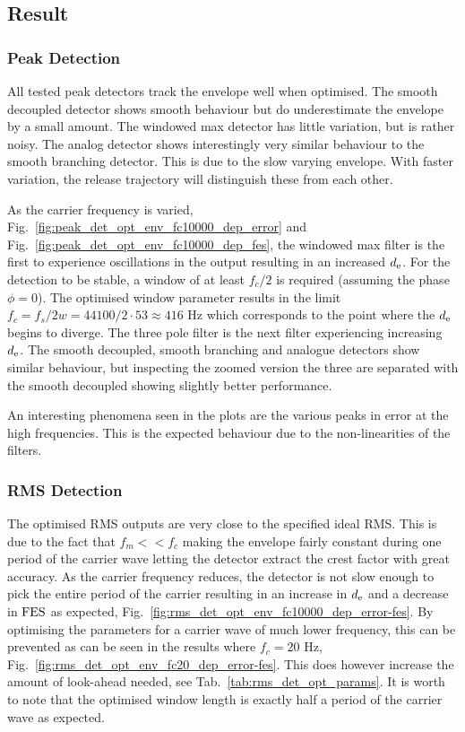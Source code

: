 \documentclass[../main2.tex]{subfiles}
\begin{document}
\subsection{Result}\label{discussion_results}
\subsubsection{Peak Detection}
All tested peak detectors track the envelope well when optimised. The smooth decoupled detector shows smooth behaviour but do underestimate the envelope by a small amount. The windowed max detector has little variation, but is rather noisy. The analog detector shows interestingly very similar behaviour to the smooth branching detector. This is due to the slow varying envelope. With faster variation, the release trajectory will distinguish these from each other.

As the carrier frequency is varied, Fig.~\ref{fig:peak_det_opt_env_fc10000_dep_error} and Fig.~\ref{fig:peak_det_opt_env_fc10000_dep_fes}, the windowed max filter is the first to experience oscillations in the output resulting in an increased $d_\text{e}$. For the detection to be stable, a window of at least $f_c/2$ is required (assuming the phase $\phi=0$). The optimised window parameter results in the limit $f_c =  f_s/2w = 44100/2\cdot 53 \approx 416$ Hz which corresponds to the point where the $d_\text{e}$ begins to diverge. The three pole filter is the next filter experiencing increasing $d_\text{e}$. The smooth decoupled, smooth branching and analogue detectors show similar behaviour, but inspecting the zoomed version the three are separated with the smooth decoupled showing slightly better performance.

An interesting phenomena seen in the plots are the various peaks in error at the high frequencies. This is the expected behaviour due to the non-linearities of the filters. 

\subsubsection{RMS Detection}
The optimised RMS outputs are very close to the specified ideal RMS. This is due to the fact that $f_m<<f_c$ making the envelope fairly constant during one period of the carrier wave letting the detector extract the crest factor with great accuracy. As the carrier frequency reduces, the detector is not slow enough to pick the entire period of the carrier resulting in an increase in $d_\text{e}$ and a decrease in $\text{FES}$ as expected, Fig.~\ref{fig:rms_det_opt_env_fc10000_dep_error-fes}. By optimising the parameters for a carrier wave of much lower frequency, this can be prevented as can be seen in the results where $f_c=20$ Hz, Fig.~\ref{fig:rms_det_opt_env_fc20_dep_error-fes}. This does however increase the amount of look-ahead needed, see Tab.~\ref{tab:rms_det_opt_params}. It is worth to note that the optimised window length is exactly half a period of the carrier wave as expected.
\end{document}
